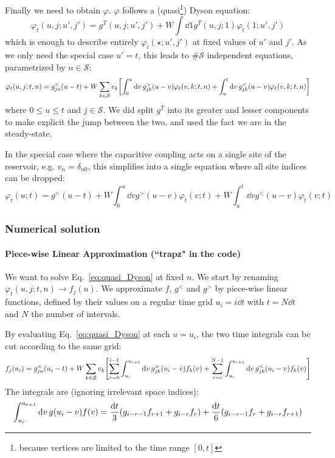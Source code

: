 \documentclass[12pt]{article}
\begin{document}
Finally we need to obtain $\varphi$. 
$\varphi$ follows a (quasi\footnote{because vertices are limited to the time range $[0, t]$}) Dyson equation:
\begin{equation}
	\varphi_t(u, j; u', j') = g^T(u, j; u', j') + W \int \dd{1} g^T(u, j; 1) \varphi_t(1; u', j')
\end{equation}
which is enough to describe entirely $\varphi_t(\star; u', j')$ at fixed values of $u'$ and $j'$. As we only need the special case $u' = t$, this leads to $\# \mathcal{S}$ independent equations, parametrized by $n \in \mathcal{S}$:
\begin{equation}
	\label{eq:quasi_Dyson}
	\varphi_t(u, j; t, n) = g_{jn}^<(u - t) + W \sum_{k \in \mathcal{S}} v_k \qty[ \int_0^u \dd{v} g_{jk}^>(u - v) \varphi_t(v, k; t, n) + \int_u^t \dd{v} g_{jk}^<(u - v) \varphi_t(v, k; t, n) ]
\end{equation}
where $0 \le u \le t$ and $j \in \mathcal{S}$.
We did split $g^T$ into its greater and lesser components to make explicit the jump between the two, and used the fact we are in the steady-state.

In the special case where the capacitive coupling acts on a single site of the reservoir, e.g. $v_n = \delta_{n0}$, this simplifies into a single equation where all site indices can be dropped:
\begin{equation}
	\label{eq:quasi_Dyson_single_site}
	\varphi_t(u; t) = g^<(u - t) + W \int_0^u \dd{v} g^>(u - v) \varphi_t(v; t) + W \int_u^t \dd{v} g^<(u - v) \varphi_t(v; t)
\end{equation}


\subsubsection{Numerical solution}

\paragraph{Piece-wise Linear Approximation (``trapz" in the code)}

We want to solve Eq.~\eqref{eq:quasi_Dyson} at fixed $n$. We start by renaming $\varphi_t(u, j; t, n) \rightarrow f_j(u)$.
We approximate $f$, $g^<$ and $g^>$ by piece-wise linear functions, defined by their values on a regular time grid $u_i = i \dd{t}$ with $t = N \dd{t}$ and $N$ the number of intervals.

By evaluating Eq.~\eqref{eq:quasi_Dyson} at each $u=u_i$, the two time integrals can be cut according to the same grid:
\begin{equation}
	f_j(u_i) = g_{jn}^<(u_i - t) + W \sum_{k \in \mathcal{S}} v_k \qty[ \sum_{r=0}^{i-1}\int_{u_r}^{u_{r+1}} \dd{v} g_{jk}^>(u_i - v) f_k(v) + \sum_{r=i}^{N-1} \int_{u_r}^{u_{r+1}} \dd{v} g_{jk}^<(u_i - v) f_k(v) ]
\end{equation}
The integrals are (ignoring irrelevant space indices):
\begin{equation}
	\int_{u_r}^{u_{r+1}} \dd{v} g(u_i - v) f(v) =
	\frac{\dd{t}}{3} \qty(g_{i - r - 1} f_{r+1} + g_{i-r} f_r) +
	\frac{\dd{t}}{6} \qty(g_{i-r-1} f_r + g_{i-r} f_{r+1})
\end{equation}
\end{document}
